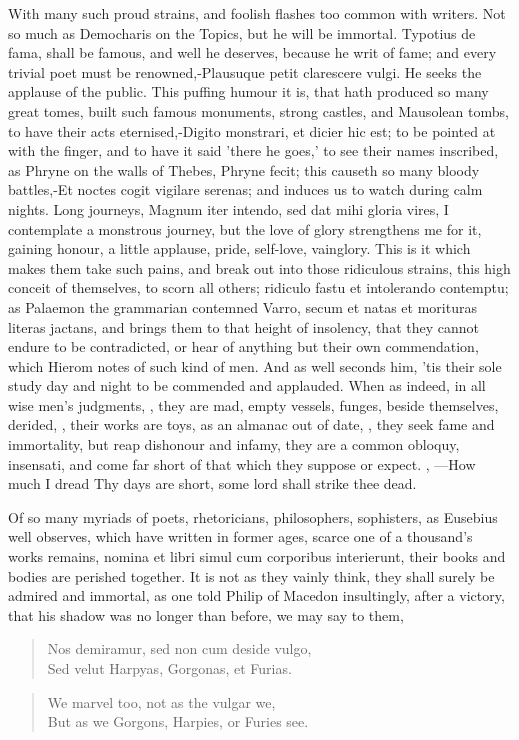 {With many such proud strains, and foolish flashes too common with writers. Not so much as Democharis on
the  Topics, but he will be immortal. Typotius de fama, shall be
famous, and well he deserves, because he writ of fame; and every
trivial poet must be renowned,-Plausuque petit clarescere vulgi. He
seeks the applause of the public. This puffing humour it is, that hath
produced so many great tomes, built such famous monuments, strong
castles, and Mausolean tombs, to have their acts eternised,-Digito
monstrari, et dicier hic est; to be pointed at with the finger, and to
have it said 'there he goes,' to see their names inscribed, as Phryne
on the walls of Thebes, Phryne fecit; this causeth so many bloody
battles,-Et noctes cogit vigilare serenas; and induces us to watch
during calm nights. Long journeys, Magnum iter intendo, sed dat mihi
gloria vires, I contemplate a monstrous journey, but the love of glory
strengthens me for it, gaining honour, a little applause, pride,
self-love, vainglory. This is it which makes them take such pains, and
break out into those ridiculous strains, this high conceit of
themselves, to scorn all others; ridiculo fastu et intolerando
contemptu; as Palaemon the grammarian contemned Varro, secum et
natas et morituras literas jactans, and brings them to that height of
insolency, that they cannot endure to be contradicted, or hear of
anything but their own commendation, which Hierom notes of such kind of
men. And as \Austin{} well seconds him, 'tis their sole study day
and night to be commended and applauded. When as indeed, in all wise
men's judgments, , they are mad, empty vessels,
funges, beside themselves, derided, , their works are toys, as
an almanac out of date, , they
seek fame and immortality, but reap dishonour and infamy, they are a
common obloquy, insensati, and come far short of that which they
suppose or expect. ,
---How much I dread
Thy days are short, some lord shall strike thee dead.

Of so many myriads of poets, rhetoricians, philosophers, sophisters, as
Eusebius well observes, which have written in former ages, scarce
one of a thousand's works remains, nomina et libri simul cum corporibus
interierunt, their books and bodies are perished together. It is not as
they vainly think, they shall surely be admired and immortal, as one
told Philip of Macedon insultingly, after a victory, that his shadow
was no longer than before, we may say to them,
%
\begin{verse}
\textlatin{Nos demiramur, sed non cum deside vulgo,}\\
\textlatin{Sed velut Harpyas, Gorgonas, et Furias.}
\end{verse}
\translationrule
\begin{verse}
We marvel too, not as the vulgar we,\\
But as we Gorgons, Harpies, or Furies see.
\end{verse}

}
